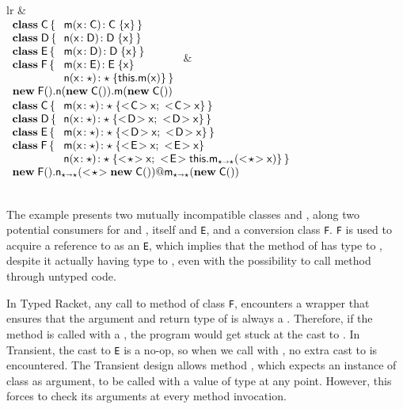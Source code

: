 \documentclass[acmsmall, anonymous, authordraft, review]{acmart} %
\newcommand{\code}[1]{{\tt #1}\xspace}
\begin{document}
\newcommand{\sspce}{;~}
\newcommand{\idbody}[1]{\SubCast{#1}\x\sspce \SubCast{#1}\x}
\begin{tabular}{lr}
 &  \\
\(
\begin{array}{l@{\,}l}
\Class\C{}{&\Mdef\m\x\C\C\x} \\
\Class\D{}{&\Mdef{\xt n}\x\D\D\x} \\
\Class{\xt E}{}{&\Mdef\m\x\D\D\x} \\
\Class{\xt F}{}{&\Mdef\m\x{\xt E}{\xt E}\x \\
                &\Mdef\n\x\any\any{\Call\this\m\x}} \\
\multicolumn{2}{l}{\Call{\Call{\New{\xt F}{}}\n{\New\C{}}}\m{\New\C{}}}
\end{array}
\) &
\(
\begin{array}{l@{\,}l}
\Class\C{}{&\Mdef\m\x\any\any{\idbody\C}} \\
\Class\D{}{&\Mdef{\xt n}\x\any\any{\idbody\D}} \\
\Class{\xt E}{}{&\Mdef\m\x\any\any{\idbody\D}} \\
\Class{\xt F}{}{&\Mdef\m\x\any\any{\idbody{\xt E}} \\
                &\Mdef\n\x\any\any{\SubCast{\any}{\x}\sspce \SubCast{\xt E}{\KCall\this\m{\SubCast\any\x}\any\any}}} \\
\multicolumn{2}{l}{\DynCall{\KCall{\New{\xt F}{}}\n{\SubCast\any{\New\C{}}}\any\any}\m{\New\C{}}}
\end{array}
\)
\end{tabular} \\[1em]

The example presents two mutually incompatible classes \C and \D,
along two potential consumers for \C and \D, \C itself and \code E,
and a conversion class \code F. \code F is used to acquire a
reference to \C as an \code E, which implies that the method \m of \C has type \D to
\D, despite it actually having type \C to \C, even with the possibility to call
method \m through untyped code.

In Typed Racket, any call to method \m of class \code F, encounters a
wrapper that ensures that the argument and return type of \m is always a
\D. Therefore, if the method \m is called with a \C, the program would get
stuck at the cast to \D. In Transient, the cast to \code E is a no-op, so
when we call \m with \C, no extra cast to \D is encountered. The Transient
design allows method \m, which expects an instance of class \C as argument,
to be called with a value of type \any at any point. However, this forces \m
to check its arguments at every method invocation.
 
\end{document}
